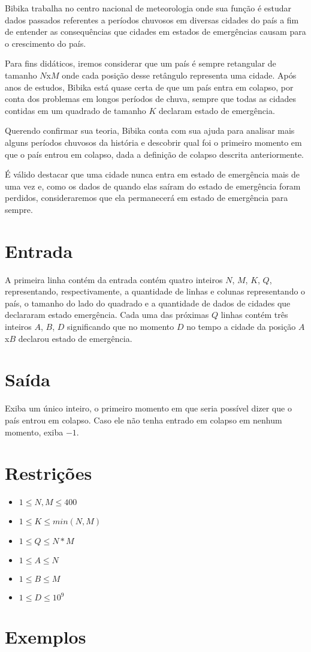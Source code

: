 Bibika trabalha no centro nacional de meteorologia onde sua função é estudar dados passados referentes a períodos chuvosos em diversas cidades do país a fim de entender as consequências que cidades em estados de emergências causam para o crescimento do país.

Para fins didáticos, iremos considerar que um país é sempre retangular de tamanho $N$x$M$ onde cada posição desse retângulo representa uma cidade. Após anos de estudos, Bibika está quase certa de que um país entra em colapso, por conta dos problemas em longos períodos de chuva, sempre que todas as cidades contidas em um quadrado de tamanho $K$ declaram estado de emergência.

Querendo confirmar sua teoria, Bibika conta com sua ajuda para analisar mais alguns períodos chuvosos da história e descobrir qual foi o primeiro momento em que o país entrou em colapso, dada a definição de colapso descrita anteriormente.

É válido destacar que uma cidade nunca entra em estado de emergência mais de uma vez e, como os dados de quando elas saíram do estado de emergência foram perdidos, consideraremos que ela permanecerá em estado de emergência para sempre.

\section*{Entrada}

A primeira linha contém da entrada contém quatro inteiros $N$, $M$, $K$, $Q$, representando, respectivamente, a quantidade de linhas e colunas representando o país, o tamanho do lado do quadrado e a quantidade de dados de cidades que declararam estado emergência.
Cada uma das próximas $Q$ linhas contém três inteiros $A$, $B$, $D$ significando que no momento $D$ no tempo a cidade da posição $A$x$B$ declarou estado de emergência. 

\section*{Saída}

Exiba um único inteiro, o primeiro momento em que seria possível dizer que o país entrou em colapso. 
Caso ele não tenha entrado em colapso em nenhum momento, exiba $-1$.

\section*{Restrições}

\begin{itemize}
\item $1 \leq N, M \leq 400$
\item $1 \leq K \leq min(N, M)$
\item $1 \leq Q \leq N*M$
\item $1 \leq A \leq N$
\item $1 \leq B \leq M$
\item $1 \leq D \leq 10^9$
\end{itemize}


\section*{Exemplos}

\exemplo
